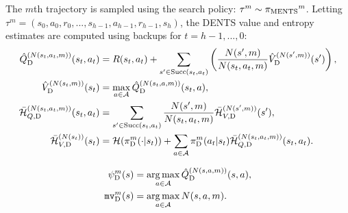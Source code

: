         The $m$th trajectory is sampled using the search policy: $\tau^m \sim {\pi_{{\textnormal{MENTS}}}}^m$. Letting $\tau^m=(s_0,a_0,r_0,...,s_{h-1},a_{h-1},r_{h-1},s_{h})$, the DENTS value and entropy estimates are computed using backups for $t=h-1, ..., 0$: 
        \begin{align}
            {\hat{Q}^{(N(s_t,a_t,m))}_{{\textnormal{D}}}}(s_t,a_t) &= 
                R(s_t,a_t) + \sum_{s' \in {\textnormal{Succ}(s_t,a_t)}} \left( 
                    \frac{N(s',m)}{N(s_t,a_t,m)} {\hat{V}^{(N(s',m))}_{{\textnormal{D}}}}(s') \right), 
                \label{appeq:dp_q_backup} \\ 
            {\hat{V}^{(N(s_t,m))}_{{\textnormal{D}}}}(s_t) &=\max_{a\in\mathcal{A}} {\hat{Q}^{(N(s_t,a,m))}_{{\textnormal{D}}}}(s_t,a), 
                \label{appeq:dp_v_backup} \\
            {\bar{\mathcal{H}}^{(N(s_t,a_t,m))}_{Q,{\textnormal{D}}}}(s_t,a_t) &= 
                \sum_{s'\in {\textnormal{Succ}(s_t,a_t)}} \frac{N(s',m)}{N(s_t,a_t,m)} {\bar{\mathcal{H}}^{(N(s',m))}_{V,{\textnormal{D}}}}(s'), \\
            {\bar{\mathcal{H}}^{(N(s_t))}_{V,{\textnormal{D}}}}(s_t) &= 
                \mathcal{H}({\pi^{m}_{{\textnormal{D}}}}(\cdot | s_t)) 
                    + \sum_{a\in\mathcal{A}} {\pi^{m}_{{\textnormal{D}}}}(a_t|s_t){\bar{\mathcal{H}}^{(N(s_t,a_t,m))}_{Q,{\textnormal{D}}}}(s_t,a_t).
        \end{align}


        \begin{align}
            {\psi^{m}_{{\textnormal{D}}}}(s) &= \operatorname*{arg\,max}_{a\in\mathcal{A}}{\hat{Q}^{(N(s,a,m))}_{{\textnormal{D}}}}(s,a), \\
            {\texttt{mv}^{m}_{{\textnormal{D}}}}(s) &= \operatorname*{arg\,max}_{a\in\mathcal{A}} N(s,a,m).
        \end{align}

